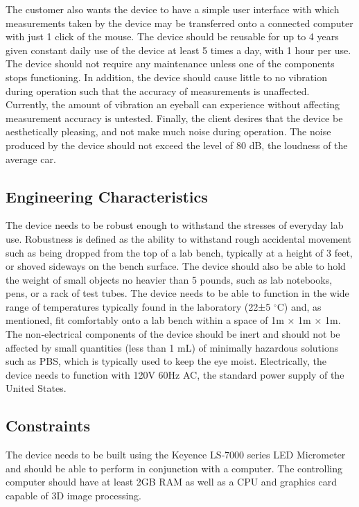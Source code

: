 \documentclass{article}
\begin{document}
The customer also wants the device to have a simple user interface with which measurements taken by the device may be transferred onto a connected computer with just 1 click of the mouse. The device should  be reusable for up to 4 years given constant daily use of the device at least 5 times a day, with 1 hour per use.\cite{keyence01} The device should not require any maintenance unless one of the components stops functioning.\cite{keyence01} In addition, the device should cause little to no vibration during operation such that the accuracy of measurements is unaffected. Currently, the amount of vibration an eyeball can experience without affecting measurement accuracy is untested. Finally, the client desires that the device be aesthetically pleasing, and not make much noise during operation. The noise produced by the device should not exceed the level of 80 dB, the loudness of the average car.\cite{truax09}

\subsection{Engineering Characteristics}
The device needs to be robust enough to withstand the stresses of
everyday lab use. Robustness is defined as the ability to withstand
rough accidental movement such as being dropped from the top of a lab
bench, typically at a height of 3 feet, or shoved sideways on the
bench surface. The device should also be able to hold the weight of
small objects no heavier than 5 pounds, such as lab notebooks, pens,
or a rack of test tubes. The device needs to be able to function in
the wide range of temperatures typically found in the laboratory (22±5
$^\circ$C) and, as mentioned, fit comfortably onto a lab bench within
a space of 1m $\times$ 1m $\times$ 1m. The non‐electrical components
of the device should be inert and should not be affected by small
quantities (less than 1 mL) of minimally hazardous solutions such as
PBS,\cite{users_manual} which is typically used to keep the eye
moist. Electrically, the device needs to function with 120V 60Hz AC,
the standard power supply of the United States.

\subsection{Constraints}
The device needs to be built using the Keyence LS‐7000 series LED Micrometer and should be able to perform in conjunction with a computer. The controlling computer should have at least 2GB RAM as well as a CPU and graphics card capable of 3D image processing.
\end{document}
